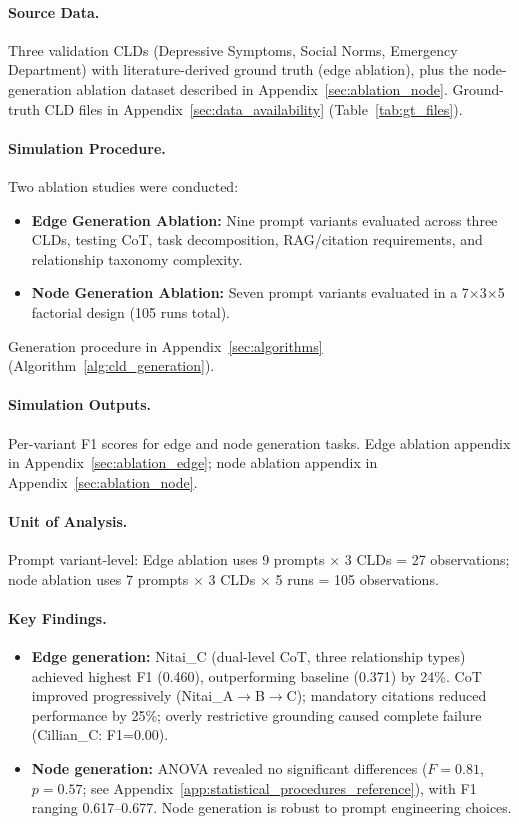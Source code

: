 \paragraph{Source Data.}
Three validation CLDs (Depressive Symptoms, Social Norms, Emergency Department) with literature-derived ground truth (edge ablation), plus the node-generation ablation dataset described in Appendix~\ref{sec:ablation_node}.
Ground-truth CLD files in Appendix~\ref{sec:data_availability} (Table~\ref{tab:gt_files}).

\paragraph{Simulation Procedure.}
Two ablation studies were conducted:
\begin{itemize}[noitemsep]
    \item \textbf{Edge Generation Ablation:} Nine prompt variants evaluated across three CLDs, testing CoT, task decomposition, RAG/citation requirements, and relationship taxonomy complexity.
    \item \textbf{Node Generation Ablation:} Seven prompt variants evaluated in a 7$\times$3$\times$5 factorial design (105 runs total).
\end{itemize}
Generation procedure in Appendix~\ref{sec:algorithms} (Algorithm~\ref{alg:cld_generation}).

\paragraph{Simulation Outputs.}
Per-variant F1 scores for edge and node generation tasks.
Edge ablation appendix in Appendix~\ref{sec:ablation_edge}; node ablation appendix in Appendix~\ref{sec:ablation_node}.

\paragraph{Unit of Analysis.}
Prompt variant-level: Edge ablation uses 9 prompts $\times$ 3 CLDs = 27 observations; node ablation uses 7 prompts $\times$ 3 CLDs $\times$ 5 runs = 105 observations.

\paragraph{Key Findings.}
\begin{itemize}[noitemsep]
    \item \textbf{Edge generation:} Nitai\_C (dual-level CoT, three relationship types) achieved highest F1 (0.460), outperforming baseline (0.371) by 24\%. CoT improved progressively (Nitai\_A$\rightarrow$B$\rightarrow$C); mandatory citations reduced performance by 25\%; overly restrictive grounding caused complete failure (Cillian\_C: F1=0.00).
    \item \textbf{Node generation:} ANOVA revealed no significant differences ($F=0.81$, $p=0.57$; see Appendix~\ref{app:statistical_procedures_reference}), with F1 ranging 0.617--0.677. Node generation is robust to prompt engineering choices.
\end{itemize}

